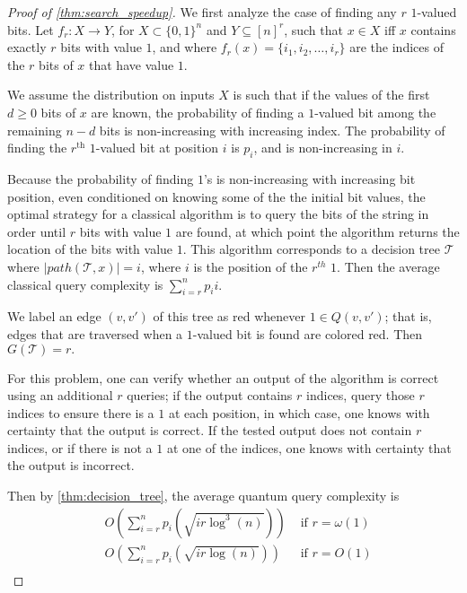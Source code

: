 \documentclass[cleveref, autoref, thm-restate,11pt]{article}
\theoremstyle{definition}
\newcommand{\sop}[1]{{\mathcal #1}}
\begin{document}
\begin{proof}[Proof of \cref{thm:search_speedup}]
We first analyze the case of finding any $r$ $1$-valued bits. Let $f_r:X\rightarrow Y$, for $X\subset\{0,1\}^n$ and $Y\subseteq[n]^r$, such that $x\in X$
iff $x$ contains exactly $r$ bits with value $1$, and 
where $f_r(x)=\{i_1,i_2,\dots,i_r\}$ are the indices of the $r$ bits of $x$ that have value $1$.

We assume the distribution on inputs $X$ is such that if the values of the first $d\geq 0$ bits of $x$ are known, the probability of finding a $1$-valued bit among the remaining $n-d$ bits is
non-increasing with increasing index.  The
probability of finding the $r^\textrm{th}$ $1$-valued bit at position $i$ is
$p_i$, and is non-increasing in $i$. 

Because the probability of finding $1$'s is non-increasing with increasing bit
position, even conditioned on knowing some of the the initial bit values, the optimal strategy for a classical algorithm is to query the bits
of the string in order until $r$ bits with value $1$ are found, at which point the algorithm returns the location of the bits with value $1$. This algorithm corresponds to a decision tree
$\sop T$ where $|path(\sop T,x)|=i$, where $i$ is the position of the $r^
{th}$ $1.$ Then the average classical query complexity is $\sum_{i=r}^{n}p_i i.$

We label an edge $(v,v')$ of this tree as red whenever $1\in Q(v,v')$; that is, edges that are traversed when a $1$-valued bit is found are
colored red. Then $G(\sop T)=r.$ 

For this problem, one can verify whether an output of the algorithm is correct using an additional $r$ queries; if the output contains $r$ indices, query those $r$ indices to ensure there is a $1$ at each position, in which case, one knows with certainty that the output is correct. If the tested output does not contain $r$ indices, or if there is not a $1$ at one of the indices, one knows with certainty that the output is incorrect. 

Then by \cref{thm:decision_tree}, 
the average quantum query complexity is
\begin{align}
&O\left(\sum_{i=r}^{n}p_i \left(\sqrt{ir \log^{3}(n)}\right)\right) &\textrm{ if }r=\omega(1)\\
&O\left(\sum_{i=r}^{n}p_i \left(\sqrt{ir \log(n)}\right)\right) &\textrm{ if }r=O(1)\\
\end{align}



\end{proof}
\end{document}
